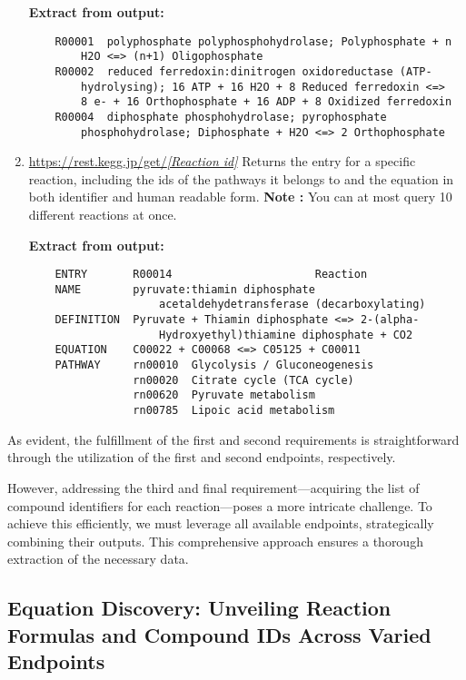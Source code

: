 \begin{enumerate}
    \begin{framed}
        \textbf{Extract from output:}
    \begin{verbatim}
    R00001	polyphosphate polyphosphohydrolase; Polyphosphate + n 
        H2O <=> (n+1) Oligophosphate
    R00002	reduced ferredoxin:dinitrogen oxidoreductase (ATP-
        hydrolysing); 16 ATP + 16 H2O + 8 Reduced ferredoxin <=> 
        8 e- + 16 Orthophosphate + 16 ADP + 8 Oxidized ferredoxin
    R00004	diphosphate phosphohydrolase; pyrophosphate 
        phosphohydrolase; Diphosphate + H2O <=> 2 Orthophosphate
        \end{verbatim}
    \end{framed}
    \item \href{https://rest.kegg.jp/get/R00014}{https://rest.kegg.jp/get/\textit{[Reaction id]}} Returns the entry for a specific reaction, including the ids of the pathways it belongs to and the equation in both identifier and human readable form. \textbf{Note :} You can at most query 10 different reactions at once.
    \begin{framed}
        \textbf{Extract from output:}
    \begin{verbatim}
    ENTRY       R00014                      Reaction
    NAME        pyruvate:thiamin diphosphate 
                    acetaldehydetransferase (decarboxylating)
    DEFINITION  Pyruvate + Thiamin diphosphate <=> 2-(alpha-
                    Hydroxyethyl)thiamine diphosphate + CO2
    EQUATION    C00022 + C00068 <=> C05125 + C00011
    PATHWAY     rn00010  Glycolysis / Gluconeogenesis
                rn00020  Citrate cycle (TCA cycle)
                rn00620  Pyruvate metabolism
                rn00785  Lipoic acid metabolism
        \end{verbatim}
    \end{framed}
\end{enumerate}

As evident, the fulfillment of the first and second requirements is straightforward through the utilization of the first and second endpoints, respectively.

However, addressing the third and final requirement—acquiring the list of compound identifiers for each reaction—poses a more intricate challenge. To achieve this efficiently, we must leverage all available endpoints, strategically combining their outputs. This comprehensive approach ensures a thorough extraction of the necessary data.

\subsection{Equation Discovery: Unveiling Reaction Formulas and Compound IDs Across Varied Endpoints}

